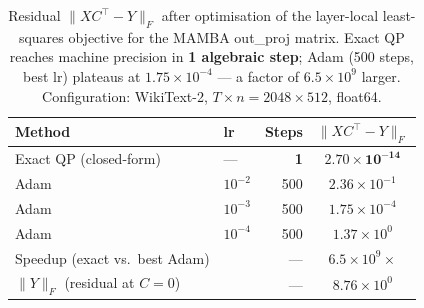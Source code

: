 \begin{table}[t]
\centering
\caption{%
  Residual $\|XC^\top - Y\|_F$ after optimisation of the layer-local
  least-squares objective for the MAMBA out\_proj matrix.
  Exact QP reaches machine precision in \textbf{1 algebraic step};
  Adam (500 steps, best lr) plateaus at $1.75\times10^{-4}$ ---
  a factor of $6.5\times10^{9}$ larger.
  Configuration: WikiText-2, $T\times n = 2048\times 512$, float64.}
\label{tab:exp1}
\begin{tabular}{llrc}
\toprule
\textbf{Method} & \textbf{lr} & \textbf{Steps} & $\|XC^\top - Y\|_F$ \\
\midrule
Exact QP (closed-form) & --- & \textbf{1} & $\mathbf{2.70\times10^{-14}}$ \\
\midrule
Adam & $10^{-2}$ & 500 & $2.36\times10^{-1}$ \\
Adam & $10^{-3}$ & 500 & $1.75\times10^{-4}$ \\
Adam & $10^{-4}$ & 500 & $1.37\times10^{0}$ \\
\midrule
Speedup (exact vs.\ best Adam) & & --- & $6.5\times10^{9}\times$ \\
$\|Y\|_F$ (residual at $C=0$) & & --- & $8.76\times10^{0}$ \\
\bottomrule
\end{tabular}
\end{table}
